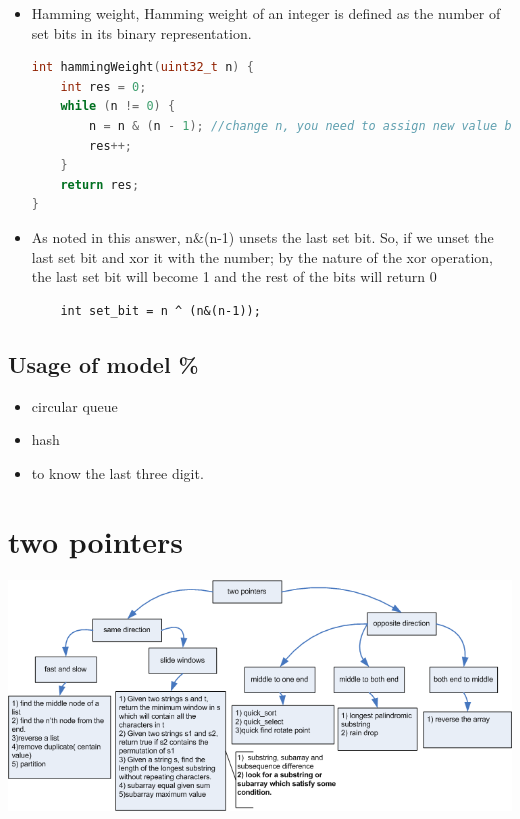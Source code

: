 \documentclass[a4paper,11pt,twoside]{book}
\begin{document}
\begin{itemize}
	\item Hamming weight,  Hamming weight of an integer is defined as the number of set bits in its binary representation. 
\begin{lstlisting}[frame=single, language=c++]	
int hammingWeight(uint32_t n) {
	int res = 0;
	while (n != 0) {
		n = n & (n - 1); //change n, you need to assign new value back to n. 
		res++;
	}
	return res;
}	
\end{lstlisting}	

	\item As noted in this answer, n\&(n-1) unsets the last set bit.
So, if we unset the last set bit and xor it with the number; by the nature of the xor operation, the last set bit will become 1 and the rest of the bits will return 0
\begin{lstlisting}
	int set_bit = n ^ (n&(n-1));
\end{lstlisting}


\end{itemize}

\subsection{Usage of model \%}

\begin{itemize}
\item circular queue
\item hash
\item to know the last three digit. 
\end{itemize}

\section{two pointers}

\includegraphics[scale=0.6]{pics/two_pointers.png} \newline
\end{document}
